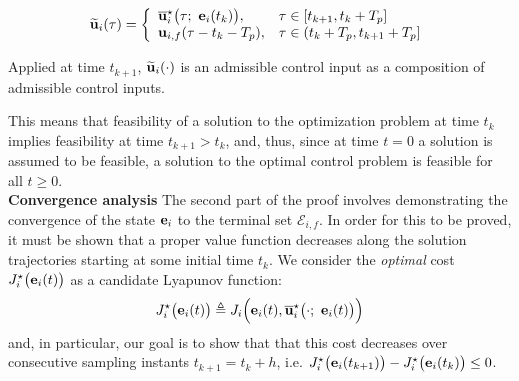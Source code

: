 \begin{equation}
  \widetilde{\bm{\mathbf{u}}}_i(\tau) = \left\{
      \begin{array}{ll}
        \overline{\bm{\mathbf{u}}}_i^{\star}\big(\tau;\ \bm{\mathbf{e}}_i(t_k)\big), & \tau \in [t_{k+1}, t_k + T_p] \\
        \bm{\mathbf{u}}_{i,f}(\tau - t_k - T_p), & \tau \in (t_k + T_p, t_{k+1} + T_p]
      \end{array}
      \right.
\label{eq:optimal_input_t_plus_one}
\end{equation}

Applied at time $t_{k+1}$, $\widetilde{\bm{\mathbf{u}}}_i(\cdot)$
is an admissible control input as a composition of admissible control inputs.

This means that feasibility of a solution to the optimization problem at time
$t_k$ implies feasibility at time $t_{k+1} > t_k$, and, thus, since at time $t=0$
a solution is assumed to be feasible, a solution to the optimal control problem
is feasible for all $t \geq 0$.\\

\textbf{Convergence analysis}
The second part of the proof involves demonstrating the convergence of the
state $\bm{\mathbf{e}}_i$ to the terminal set $\mathcal{E}_{i,f}$. In order for this
to be proved, it must be shown that a proper value function decreases along
the solution trajectories starting at some initial time $t_k$. We consider the
\textit{optimal} cost $J_i^{\star}\big(\bm{\mathbf{e}}_i(t)\big)$ as a candidate
Lyapunov function:
$$J_i^{\star}\big(\bm{\mathbf{e}}_i(t)\big) \triangleq J_i \Big(\bm{\mathbf{e}}_i(t), \overline{\bm{\mathbf{u}}}_i^{\star}\big(\cdot;\ \bm{\mathbf{e}}_i(t)\big)\Big)$$
and, in particular, our goal is to show that that this cost decreases over
consecutive sampling instants $t_{k+1} = t_k + h$, i.e.
$J_i^{\star}\big(\bm{\mathbf{e}}_i(t_{k+1})\big) - J_i^{\star}\big(\bm{\mathbf{e}}_i(t_k)\big) \leq 0$.\\

